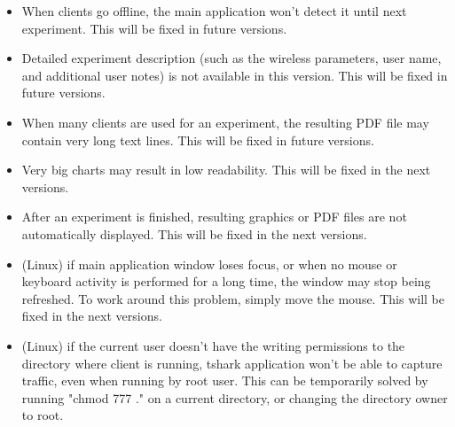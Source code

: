 \documentclass[12pt]{report}
\begin{document}
\begin{itemize}

\item When clients go offline, the main application won't detect it until
next experiment. This will be fixed in future versions.

\item Detailed experiment description (such as the wireless parameters, user
name, and additional user notes) is not available in this version. This will
be fixed in future versions.

\item When many clients are used for an experiment, the resulting PDF file
may contain very long text lines. This will be fixed in future versions.

\item Very big charts may result in low readability. This will be fixed in
the next versions.

\item After an experiment is finished, resulting graphics or PDF files are
not automatically displayed. This will be fixed in the next versions.

\item (Linux) if main application window loses focus, or when no mouse or
keyboard activity is performed for a long time, the window may stop being
refreshed. To work around this problem, simply move the mouse. This will be
fixed in the next versions.

\item (Linux) if the current user doesn't have the writing permissions to
the directory where client is running, tshark application won't be able to
capture traffic, even when running by root user. This can be temporarily
solved by running "chmod 777 ." on a current directory, or changing the
directory owner to root.

\end{itemize}
\end{document}
